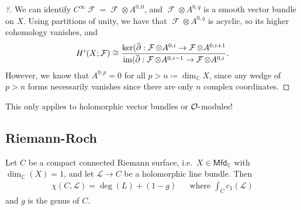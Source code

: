 \begin{proof}[?]

We can identify
\(C^{\infty }\operatorname{\mathcal{F}} = \operatorname{\mathcal{F}} \otimes A^{0, 0}\),
and \(\operatorname{\mathcal{F}} \otimes A^{0, q}\) is a smooth vector
bundle on \(X\). Using partitions of unity, we have that
\(\operatorname{\mathcal{F}} \otimes A^{0, q}\) is acyclic, so its
higher cohomology vanishes, and
\begin{align*}
H^i(X; \operatorname{\mathcal{F}} ) \cong 
\frac
{ \ker ( \mkern 1.5mu\overline{\mkern-1.5mu{\partial}\mkern-1.5mu}\mkern 1.5mu: \operatorname{\mathcal{F}}\otimes A^{0, i} \to \operatorname{\mathcal{F}} \otimes A^{0, i+1} }
{ \operatorname{im}( \mkern 1.5mu\overline{\mkern-1.5mu{\partial}\mkern-1.5mu}\mkern 1.5mu: \operatorname{\mathcal{F}}\otimes A^{0, i-1} \to \operatorname{\mathcal{F}} \otimes A^{0, i} }
.\end{align*}
However, we know that \(A^{0, p} = 0\) for all
\(p> n \coloneqq\dim_{\mathbb{C}}X\), since any wedge of \(p>n\) forms
necessarily vanishes since there are only \(n\) complex coordinates.

\end{proof}

\begin{warnings}

This only applies to holomorphic vector bundles or
\({\mathcal{O}}{\hbox{-}}\)modules!

\end{warnings}

\hypertarget{riemann-roch}{%
\subsection{Riemann-Roch}\label{riemann-roch}}

\begin{theorem}

Let \(C\) be a compact connected Riemann surface,
i.e.~\(X\in {\mathsf{Mfd}}_{\mathbb{C}}\) with
\(\dim_{\mathbb{C}}(X) = 1\), and let \(\mathcal{L}\to C\) be a
holomorphic line bundle. Then
\begin{align*}
\chi(C, \mathcal{L}) = \deg(L) + (1-g) && \text{where } \int_C c_1(\mathcal{L})
\end{align*}
and \(g\) is the genus of \(C\).

\end{theorem}

